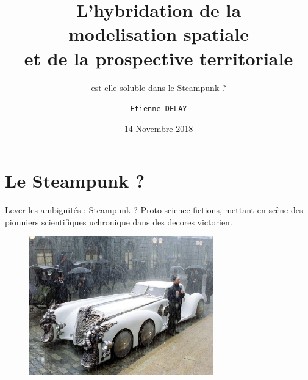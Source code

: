 \documentclass[newPxFont]{beamer}
\title{L'hybridation de la \\modelisation spatiale \\et de la prospective territoriale}
\subtitle{est-elle soluble dans le Steampunk ?}
\date{14 Novembre 2018}
\author{\texttt{Etienne DELAY}}
\institute{UR GREEN}
\begin{document}
%
%

\maketitle


%
%

\section{Le Steampunk ?}


\begin{frame}[c]{Lever les ambiguités : Steampunk ? }
\vspace{-1cm}
Proto-science-fictions, mettant en scène des pionniers scientifiques uchronique dans des decores victorien.
\begin{figure}
  \includegraphics[height=6cm]{img/a_steampunk_car.jpg}
\end{figure}
\end{frame}
\end{document}

